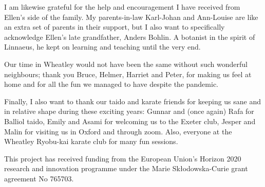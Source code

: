 I am likewise grateful for the help and encouragement I have received from Ellen's side of the family. My parents-in-law Karl-Johan and Ann-Louise are like an extra set of parents in their support, but I also want to specifically acknowledge Ellen's late grandfather, Anders Bohlin. A botanist in the spirit of Linnaeus, he kept on learning and teaching until the very end.

Our time in Wheatley would not have been the same without such wonderful neighbours; thank you Bruce, Helmer, Harriet and Peter, for making us feel at home and for all the fun we managed to have despite the pandemic.

Finally, I also want to thank our taido and karate friends for keeping us sane and in relative shape during these exciting years: Gunnar and (once again) Rafa for Balliol taido, Emily and Asami for welcoming us to the Exeter club, Jesper and Malin for visiting us in Oxford and through zoom. Also, everyone at the Wheatley Ryobu-kai karate club for many fun sessions.




This project has received funding from the European Union's Horizon 2020 research and innovation programme under the Marie Skłodowska-Curie grant agreement No 765703.
